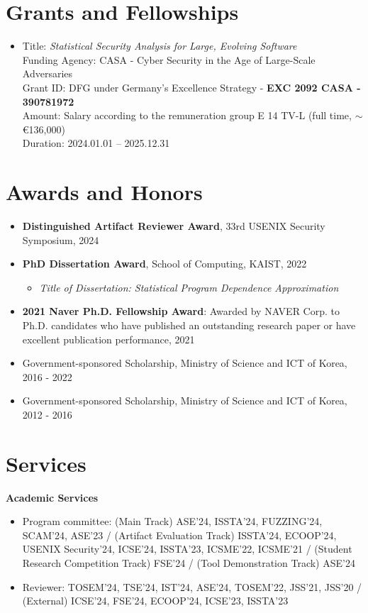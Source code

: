 \documentclass[letterpaper,11pt]{article}
\begin{document}
\section{Grants and Fellowships}
\begin{itemize}
  \item Title: \emph{Statistical Security Analysis for Large, Evolving Software} \\
        Funding Agency: CASA - Cyber Security in the Age of Large-Scale Adversaries \\
        Grant ID: DFG under Germany's Excellence Strategy - \textbf{EXC 2092 CASA - 390781972} \\
        Amount: Salary according to the remuneration group E 14 TV-L (full time, $\sim$ \euro{136,000}) \\
        Duration: 2024.01.01 -- 2025.12.31
\end{itemize}

\section{Awards and Honors}
\begin{itemize}
  \item \textbf{Distinguished Artifact Reviewer Award}, 33rd USENIX Security Symposium, 2024
  \item \textbf{PhD Dissertation Award}, School of Computing, KAIST, 2022
        \vspace{-5pt}\begin{itemize}
          \item \emph{Title of Dissertation: Statistical Program Dependence Approximation}
        \end{itemize}
  \item \textbf{2021 Naver Ph.D. Fellowship Award}: Awarded by NAVER Corp. to Ph.D. candidates who have published an outstanding research paper or have excellent publication performance, 2021
  \item Government-sponsored Scholarship, Ministry of Science and ICT of Korea, 2016 - 2022
  \item Government-sponsored Scholarship, Ministry of Science and ICT of Korea, 2012 - 2016
\end{itemize}

\section{Services}
\textbf{Academic Services}\vspace{-4pt}
\begin{itemize}
  \item Program committee: (Main Track) ASE'24, ISSTA'24, FUZZING'24, SCAM'24, ASE'23 / (Artifact Evaluation Track) ISSTA'24, ECOOP'24, USENIX Security'24, ICSE'24, ISSTA'23, ICSME'22, ICSME'21 / (Student Research Competition Track) FSE'24 / (Tool Demonstration Track) ASE'24
  \item Reviewer: TOSEM'24, TSE'24, IST'24, ASE'24, TOSEM'22, JSS'21, JSS'20  / (External) ICSE'24, FSE'24, ECOOP'24, ICSE'23, ISSTA'23
\end{itemize}
\end{document}
